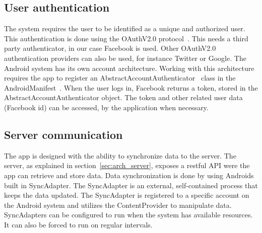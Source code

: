 \subsection{User authentication}

The system requires the user to be identified as a unique and authorized user. This authentication is done using the OAuthV2.0 protocol~\cite{oauthv2.0}. This needs a third party authenticator, in our case Facebook is used. Other OAuthV2.0 authentication providers can also be used, for instance Twitter or Google.
The Android system has its own account architecture. Working with this architecture requires the app to register an AbstractAccountAuthenticator~\cite{androidAccount} class in the AndroidManifest~\cite{androidmanifest}. When the user logs in, Facebook returns a token, stored in the AbstractAccountAuthenticator object. The token and other related user data (Facebook id) can be accessed, by the application when necessary.

\subsection{Server communication}
The app is designed with the ability to synchronize data to the server. The server, as explained in section~\ref{sec:arch_server}, exposes a restful API were the app can retrieve and store data. Data synchronization is done by using Androids built in SyncAdapter. The SyncAdapter is an external, self-contained process that keeps the data updated. The SyncAdapter is registered to a specific account on the Android system and utilizes the ContentProvider to manipulate data. SyncAdapters can be configured to run when the system has available resources. It can also be forced to run on regular intervals.
